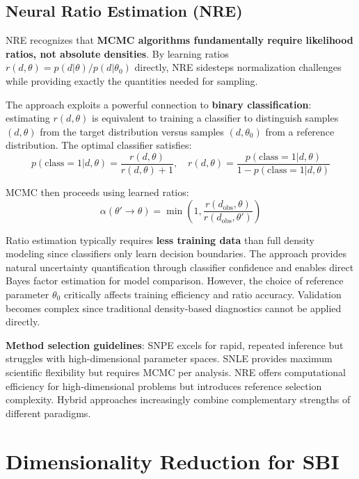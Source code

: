 \documentclass{SciPost}
\begin{document}
\subsection{Neural Ratio Estimation (NRE)}

NRE recognizes that \textbf{MCMC algorithms fundamentally require likelihood ratios, not absolute densities}. By learning ratios $r(d,\theta) = p(d|\theta)/p(d|\theta_0)$ directly, NRE sidesteps normalization challenges while providing exactly the quantities needed for sampling.

The approach exploits a powerful connection to \textbf{binary classification}: estimating $r(d,\theta)$ is equivalent to training a classifier to distinguish samples $(d,\theta)$ from the target distribution versus samples $(d,\theta_0)$ from a reference distribution. The optimal classifier satisfies:
\begin{equation}
    p(\text{class}=1|d,\theta) = \frac{r(d,\theta)}{r(d,\theta) + 1}, \quad r(d,\theta) = \frac{p(\text{class}=1|d,\theta)}{1-p(\text{class}=1|d,\theta)}
\end{equation}

MCMC then proceeds using learned ratios:
\begin{equation}
    \alpha(\theta' \rightarrow \theta) = \min\left(1, \frac{r(d_{\text{obs}},\theta)}{r(d_{\text{obs}},\theta')}\right)
\end{equation}

Ratio estimation typically requires \textbf{less training data} than full density modeling since classifiers only learn decision boundaries. The approach provides natural uncertainty quantification through classifier confidence and enables direct Bayes factor estimation for model comparison. However, the choice of reference parameter $\theta_0$ critically affects training efficiency and ratio accuracy. Validation becomes complex since traditional density-based diagnostics cannot be applied directly.

\bigskip

\textbf{Method selection guidelines}: SNPE excels for rapid, repeated inference but struggles with high-dimensional parameter spaces. SNLE provides maximum scientific flexibility but requires MCMC per analysis. NRE offers computational efficiency for high-dimensional problems but introduces reference selection complexity. Hybrid approaches increasingly combine complementary strengths of different paradigms.

\section{Dimensionality Reduction for SBI}
\end{document}
